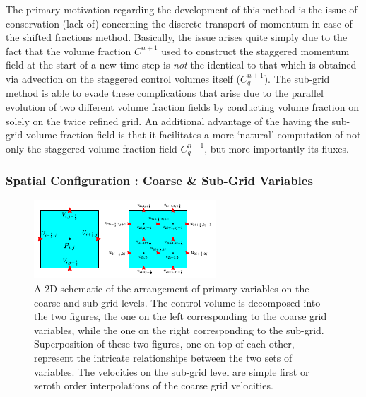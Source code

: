 The primary motivation regarding the development of this 
method is the issue of conservation (lack of) concerning 
the discrete transport of momentum in case of the shifted fractions method.     
Basically, the issue arises quite simply due to the fact that the volume fraction 
$C^{n+1}$ used to construct the staggered momentum field at the start of a 
new time step is \textit{not} the identical to that which is obtained 
via advection on the staggered control volumes itself ($C_{q}^{n+1}$). 
The sub-grid method is able to evade these complications that arise due to
the parallel evolution of two different volume fraction fields by conducting 
volume fraction on solely on the twice refined grid.  
An additional advantage of the having the sub-grid volume fraction field is that 
it facilitates a more `natural' computation of not only the staggered 
volume fraction field $C^{n+1}_q$, but more importantly its fluxes. 



\subsubsection*{Spatial Configuration : Coarse \& Sub-Grid Variables}

\begin{figure}[h!]
\includegraphics[width = \textwidth]{plots/sub_grid.pdf} 
\centering
\caption{A 2D schematic of the arrangement of primary variables 
on the coarse and sub-grid levels. 
The control volume is decomposed into the two figures, the one
on the left corresponding to the coarse grid variables, while the 
one on the right corresponding to the sub-grid. 
Superposition of these two figures, one on top of each other,
represent the intricate relationships between the two sets of variables.
The velocities on the sub-grid level are simple first 
or zeroth order interpolations of the coarse grid velocities.
}
\label{sub_grid}
\end{figure}

